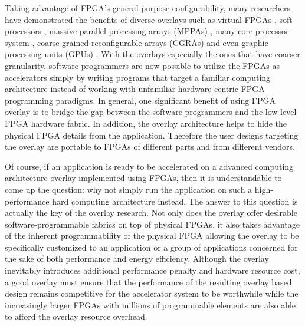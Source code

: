 Taking advantage of FPGA's general-purpose configurability, many researchers have demonstrated the benefits of diverse overlays such as virtual FPGAs \cite{brant2012ZUMA, grant2011malibu, coole2010intermediate}, soft processors \cite{nios, microblaze, guy2012VENICE}, massive parallel processing arrays (MPPAs) \cite{kissler2006dynamically, boppu2014compact, hannig2014invasive}, many-core processor system \cite{lebedev2010MARC}, coarse-grained reconfigurable arrays (CGRAs)\cite{lin2012energy, jain2015efficient, capalijia2013pipelined} and even graphic processing units (GPUs) \cite{al-dujaili2012Guppy}. With the overlays especially the ones that have coarser granularity, software programmers are now possible to utilize the FPGAs as accelerators simply by writing programs that target a familiar computing architecture instead of working with unfamiliar hardware-centric FPGA programming paradigms. In general, one significant benefit of using FPGA overlay is to bridge the gap between the software programmers and the low-level FPGA hardware fabric. In addition, the overlay architecture helps to hide the physical FPGA details from the application. Therefore the user designs targeting the overlay are portable to FPGAs of different parts and from different vendors.

Of course, if an application is ready to be accelerated on a advanced computing architecture overlay implemented using FPGAs, then it is understandable to come up the question: why not simply run the application on such a high-performance hard computing architecture instead. The answer to this question is actually the key of the overlay research. Not only does the overlay offer desirable software-programmable fabrics on top of physical FPGAs, it also takes advantage of the inherent programmability of the physical FPGA allowing the overlay to be specifically customized to an application or a group of applications concerned for the sake of both performance and energy efficiency. Although the overlay inevitably introduces additional performance penalty and hardware resource cost, a good overlay must ensure that the performance of the resulting overlay based design remains competitive for the accelerator system to be worthwhile while the increasingly larger FPGAs with millions of programmable elements \cite{virtex-ultrascale} are also able to afford the overlay resource overhead.

